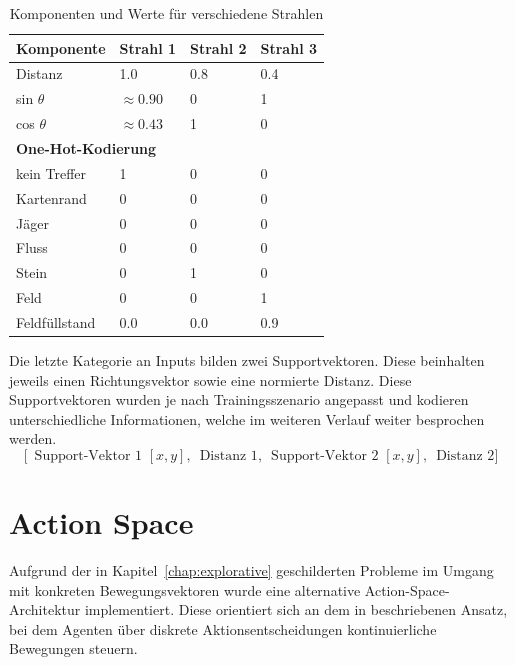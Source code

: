 \begin{table}[htbp]
\centering
\caption{Komponenten und Werte für verschiedene Strahlen}
\label{tab:strahlkomponenten}
\begin{tabular}{llll}
\toprule
\textbf{Komponente}        & \textbf{Strahl 1} & \textbf{Strahl 2} & \textbf{Strahl 3}\\
\midrule
Distanz                    & 1.0               & 0.8 & 0.4 \\
sin $\theta$               & $\approx0.90$    & 0   & 1   \\
cos $\theta$               & $\approx0.43$    & 1   & 0   \\
\midrule
\multicolumn{4}{l}{\textbf{One-Hot-Kodierung}}\\
kein Treffer & 1 & 0 & 0\\
Kartenrand      & 0 & 0 & 0\\
Jäger           & 0 & 0 & 0\\
Fluss           & 0 & 0 & 0\\
Stein           & 0 & 1 & 0\\
Feld            & 0 & 0 & 1\\
\midrule
Feldfüllstand & 0.0 & 0.0 & 0.9\\
\bottomrule
\end{tabular}
\end{table}

Die letzte Kategorie an Inputs bilden zwei Supportvektoren. Diese beinhalten jeweils einen Richtungsvektor sowie eine normierte Distanz. Diese Supportvektoren wurden je nach Trainingsszenario angepasst und kodieren unterschiedliche Informationen, welche im weiteren Verlauf weiter besprochen werden.
\[
\bigl[\,
    \text{ Support-Vektor 1 }[x,y],\,
    \text{ Distanz 1},\,
    \text{ Support-Vektor 2 }[x,y],\,
    \text{ Distanz 2}
\bigr]
\]

  
\section{Action Space}
Aufgrund der in Kapitel~\ref{chap:explorative} geschilderten Probleme im Umgang mit konkreten Bewegungsvektoren wurde eine alternative Action-Space-Architektur implementiert. Diese orientiert sich an dem in \cite{baker2020emergenttoolusemultiagent} beschriebenen Ansatz, bei dem Agenten über diskrete Aktionsentscheidungen kontinuierliche Bewegungen steuern.

